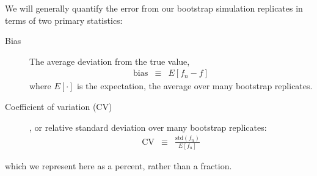 \documentclass[aps,pre,twocolumn,nofootinbib,superscriptaddress,linenumbers]{revtex4-1}
\begin{document}
We will generally quantify the error from our bootstrap simulation replicates in terms of two primary statistics:
\begin{description}
\item[Bias] The average deviation from the true value,
\begin{eqnarray}
\mathrm{bias} &\equiv& E[ f_n - f ]
\end{eqnarray}
where $E[\cdot]$ is the expectation, the average over many bootstrap replicates.
\item[Coefficient of variation (CV)], or relative standard deviation over many bootstrap replicates:
\begin{eqnarray}
\mathrm{CV} &\equiv& \frac{\mathrm{std}(f_n)}{E[f_n]}
\end{eqnarray}
\end{description}
which we represent here as a percent, rather than a fraction.


%
\end{document}
